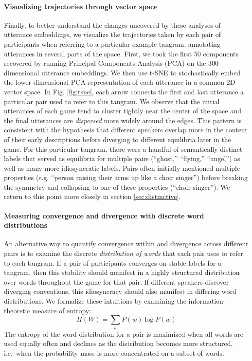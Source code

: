 \paragraph{Visualizing trajectories through vector space}  
Finally, to better understand the changes uncovered by these analyses of utterance embeddings, we visualize the trajectories taken by each pair of participants when referring to a particular example tangram, annotating utterances in several parts of the space.
First, we took the first 50 components recovered by running Principal Components Analysis (PCA) on the 300-dimensional utterance embeddings. 
We then use t-SNE \cite{maaten2008visualizing} to stochastically embed the lower-dimensional PCA representation of each utterance in a common 2D vector space. 
In Fig. \ref{fig:tsne}, each arrow connects the first and last utterance a particular pair used to refer to this tangram.
We observe that the initial utterances of each game tend to cluster tightly near the center of the space and the final utterances are \emph{dispersed} more widely around the edges. 
This pattern is consistent with the hypothesis that different speakers overlap more in the content of their early descriptions before diverging to different equilibria later in the game.
For this particular tangram, there were a handful of semantically distinct labels that served as equilibria for multiple pairs (``ghost,'' ``flying,'' ``angel'') as well as many more idiosyncratic labels.
Pairs often initially mentioned multiple properties (e.g. ``person raising their arms up like a choir singer'') before breaking the symmetry and collapsing to one of these properties (``choir singer'').
We return to this point more closely in section \ref{sec:distinctive}.

\paragraph{Measuring convergence and divergence with discrete word distributions}

An alternative way to quantify convergence within and divergence across different pairs is to examine the discrete \emph{distribution of words} that each pair uses to refer to each tangram.
If a pair of participants converges on stable labels for a tangram, then this stability should manifest in a highly structured distribution over words throughout the game for that pair.
If different speakers discover diverging conventions, this idiosyncracy should also manifest in differing word distributions.
We formalize these intuitions by examining the information-theoretic measure of entropy: $$H(W) = \sum_w P(w) \log P(w)$$
The entropy of the word distribution for a pair is maximized when all words are used equally often and declines as the distribution becomes more structured, i.e.~when the probability mass is more concentrated on a subset of words.


